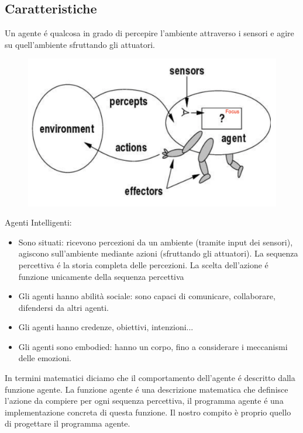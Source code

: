 \documentclass{article}
\begin{document}
\subsection{Caratteristiche}
Un agente é qualcosa in grado di percepire l'ambiente attraverso i sensori e agire su quell'ambiente sfruttando gli attuatori.
\begin{figure}[H]
    \centering
    \includegraphics[scale=0.25]{Images/AgentiAIMA.png}
\end{figure}
Agenti Intelligenti: 
\begin{itemize}
    \item Sono situati: ricevono percezioni da un ambiente (tramite input dei sensori), agiscono sull'ambiente mediante azioni (sfruttando gli attuatori). \newline 
    La sequenza percettiva é la storia completa delle percezioni. La scelta dell'azione é funzione unicamente della sequenza percettiva
    \item Gli agenti hanno abilità sociale: sono capaci di comunicare, collaborare, difendersi da altri agenti.
    \item Gli agenti hanno credenze, obiettivi, intenzioni...
    \item Gli agenti sono embodied: hanno un corpo, fino a considerare i meccanismi delle emozioni.
\end{itemize}
In termini matematici diciamo che il comportamento dell'agente é descritto dalla funzione agente. La funzione agente é una descrizione matematica che definisce l’azione da compiere per ogni sequenza percettiva, il programma agente é una implementazione concreta di questa funzione. Il nostro compito è proprio quello di progettare il programma agente.
\clearpage
\end{document}
